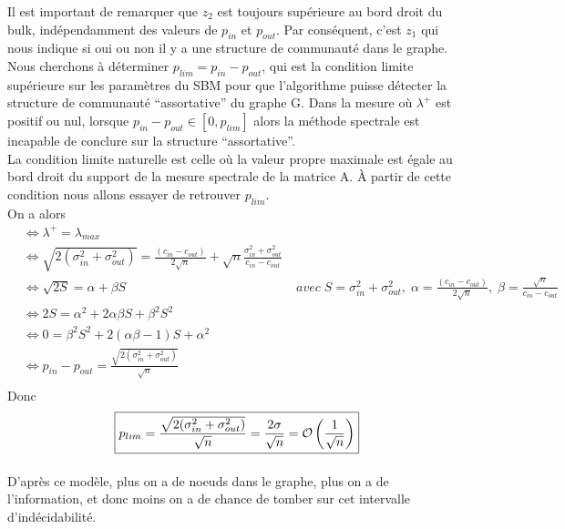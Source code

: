 Il est important de remarquer que $z_2$ est toujours supérieure au bord droit du bulk, indépendamment des valeurs de $p_{in}$ et $p_{out}$.
Par conséquent, c'est $z_1$ qui nous indique si oui ou non il y a une structure de communauté dans le graphe.\\

Nous cherchons à déterminer $p_{lim} = p_{in} - p_{out}$, qui est la condition limite supérieure sur les paramètres du SBM pour que l'algorithme puisse détecter la structure de communauté ``assortative'' du graphe G.
Dans la mesure où  $\lambda^+$ est positif ou nul, lorsque $p_{in} - p_{out} \in [0, p_{lim}]$ alors la méthode spectrale est incapable de conclure sur la structure ``assortative''.\\
 
La condition limite naturelle est celle où la valeur propre maximale est égale au bord droit du support de la mesure spectrale de la matrice A.
À partir de cette condition nous allons essayer de retrouver $p_{lim}$.\\
On a alors 
\begin{align*}
	&\Leftrightarrow \lambda^+ = \lambda_{max}\\
	&\Leftrightarrow \sqrt{2(\sigma_{in}^2 + \sigma_{out}^2)} = \frac{(c_{in} - c_{out})}{2\sqrt{n}} + \sqrt{n}\frac{\sigma_{in}^2 + \sigma_{out}^2}{c_{in} - c_{out}}\\
	&\Leftrightarrow \sqrt{2S} = \alpha + \beta S &\; avec  \; S = \sigma_{in}^2 + \sigma_{out}^2,\;\alpha=\frac{(c_{in} - c_{out})}{2\sqrt{n}}, \; \beta=  \frac{\sqrt{n}}{c_{in} - c_{out}}\\
	&\Leftrightarrow 2S = \alpha^2 + 2\alpha \beta S +\beta^2 S^2\\
	&\Leftrightarrow 0 = \beta^2 S^2 + 2(\alpha \beta - 1)S+ \alpha^2 \\
	&\Leftrightarrow p_{in} - p_{out} = \frac{\sqrt{2(\sigma_{in}^2 + \sigma_{out}^2)}}{\sqrt{n}}  \\
\end{align*}
Donc
\begin{equation}
	\boxed{p_{lim} = \frac{\sqrt{2(\sigma_{in}^2 + \sigma_{out}^2)}}{\sqrt{n}}= \frac{2\sigma}{\sqrt{n}} = \mathcal{O}\left(\frac{1}{\sqrt{n}}\right)}\\
\end{equation}

\paragraph{}\label{rq:ngrand}
D'après ce modèle, plus on a de noeuds dans le graphe, plus on a de l'information, et donc moins on a de chance de tomber sur cet intervalle d’indécidabilité.\\

